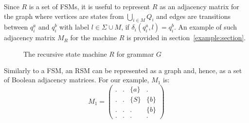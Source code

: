Since $R$ is a set of FSMs, it is useful to represent $R$ as an adjacency matrix for the graph where vertices are states from $\bigcup_{i \in M}Q_i$ and edges are transitions between $q_i^a$ and $q_i^b$ with label $l \in \Sigma \cup M$, if $\delta_i (q_i^a, l) = q_i^b$.
An example of such adjacency matrix $M_R$ for the machine $R$ is provided in section~\ref{example:section}.

\begin{figure}[h]
    \centering
    \caption{The recursive state machine $R$ for grammar $G$}
    \label{example:automata}
\end{figure}

Similarly to a FSM, an RSM can be represented as a graph and, hence, as a set of Boolean adjacency matrices.
For our example, $M_1$ is:
    $$
    M_1 =
    \begin{pmatrix}
    . & . & \{a\} & .     \\
    . & . & \{S\} & \{b\} \\
    . & . & . & \{b\}     \\
    . & . & . & .
    \end{pmatrix}
    $$

